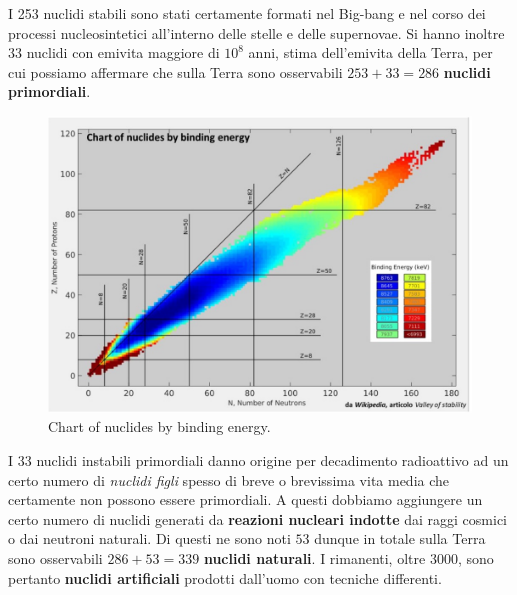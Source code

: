 I 253 nuclidi stabili sono stati certamente formati nel Big-bang e nel corso dei processi nucleosintetici all’interno
delle stelle e delle supernovae.
Si hanno inoltre $33$ nuclidi con emivita maggiore di $ {10}^{8}$ anni, stima dell'emivita della Terra, per cui possiamo
affermare che sulla Terra sono osservabili $253+33=286$ \textbf{nuclidi primordiali}.
\begin{figure}
    \centering
    \includegraphics{../figs/nuclides-chart-binding-energy}
    \caption{Chart of nuclides by binding energy.}
    \label{fig:nuclides-chart-binding-energy}
\end{figure}
I $33$ nuclidi instabili primordiali danno origine per decadimento radioattivo ad un certo numero di \emph{nuclidi figli}
spesso di breve o brevissima vita media che certamente non possono essere primordiali.
A questi dobbiamo aggiungere un certo numero di nuclidi generati da \textbf{reazioni nucleari indotte} dai raggi cosmici o dai neutroni naturali.
Di questi ne sono noti $53$ dunque in totale sulla Terra sono osservabili $286+53=339$ \textbf{nuclidi naturali}.
I rimanenti, oltre $3000$, sono pertanto \textbf{nuclidi artificiali} prodotti dall’uomo con tecniche differenti.

